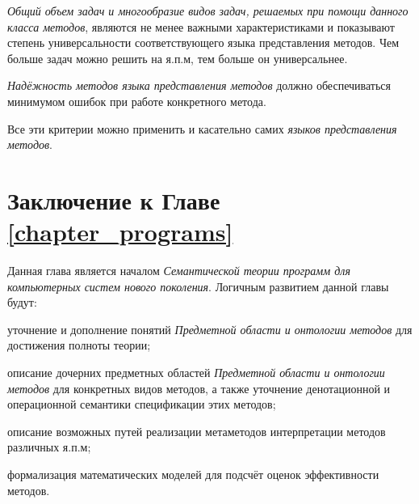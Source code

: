 \textit{Общий объем задач и многообразие видов задач, решаемых при помощи данного класса методов}, являются не менее важными характеристиками и показывают степень универсальности соответствующего языка представления методов. Чем больше задач можно решить на я.п.м, тем больше он универсальнее.

\textit{Надёжность методов языка представления методов} должно обеспечиваться минимумом ошибок при работе конкретного метода.

Все эти критерии можно применить и касательно самих \textit{языков представления методов}.

\section*{Заключение к Главе \ref{chapter_programs}}

Данная глава является началом \textit{Семантической теории программ для компьютерных систем нового поколения}. Логичным развитием данной главы будут:

\begin{textitemize}
    \item уточнение и дополнение понятий \textit{Предметной области и онтологии методов} для достижения полноты теории;
    \item описание дочерних предметных областей \textit{Предметной области и онтологии методов} для конкретных видов методов, а также уточнение денотационной и операционной семантики спецификации этих методов;
    \item описание возможных путей реализации метаметодов интерпретации методов различных я.п.м;
    \item формализация математических моделей для подсчёт оценок эффективности методов.
\end{textitemize}

